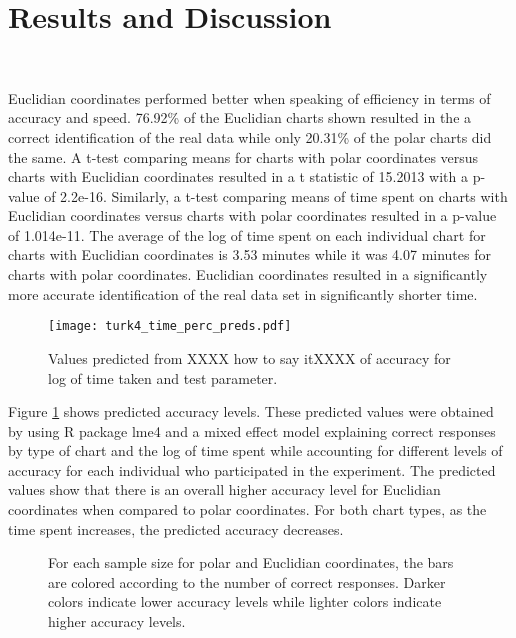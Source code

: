 \section{Results and Discussion}~\label{results}

Euclidian coordinates performed better when speaking of efficiency in terms of accuracy and speed. 76.92\% of the Euclidian charts shown resulted in the a correct identification of the real data while only 20.31\% of the polar charts did the same. A t-test comparing means for charts with polar coordinates versus charts with Euclidian coordinates resulted in a t statistic of 15.2013 with a p-value of 2.2e-16. Similarly, a t-test comparing means of time spent on charts with Euclidian coordinates versus charts with polar coordinates resulted in a p-value of 1.014e-11. The average of the log of time spent on each individual chart for charts with Euclidian coordinates is 3.53 minutes while it was 4.07 minutes for charts with polar coordinates. Euclidian coordinates resulted in a significantly more accurate identification of the real data set in significantly shorter time. 

\begin{figure}[htbp] %
   \centering
   \texttt{[image: turk4\_time\_perc\_preds.pdf]}  
   \caption{Values predicted from XXXX how to say itXXXX of accuracy for log of time taken and test parameter.}
   \label{accuracy_preds}
\end{figure}

Figure \ref{accuracy_preds} shows predicted accuracy levels. These predicted values were obtained by using R package lme4 and a mixed effect model explaining correct responses by type of chart and the log of time spent while accounting for different levels of accuracy for each individual who participated in the experiment. The predicted values show that there is an overall higher accuracy level for Euclidian coordinates when compared to polar coordinates. For both chart types, as the time spent increases, the predicted accuracy decreases. 

\begin{figure}[htbp] %
   \centering
   \caption{For each sample size for polar and Euclidian coordinates, the bars are colored according to the number of correct responses. Darker colors indicate lower accuracy levels while lighter colors indicate higher accuracy levels. }
   \label{samp_size_acc}
\end{figure}

